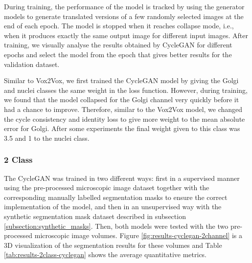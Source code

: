 During training, the performance of the model is tracked by using the generator models to generate translated versions of a few randomly selected images at the end of each epoch. The model is stopped when it reaches collapse mode, i.e., when it produces exactly the same output image for different input images. After training, we visually analyse the results obtained by CycleGAN for different epochs and select the model from the epoch that gives better results for the validation dataset.

Similar to Vox2Vox, we first trained the CycleGAN model by giving the Golgi and nuclei classes the same weight in the loss function. However, during training, we found that the model collapsed for the Golgi channel very quickly before it had a chance to improve. Therefore, similar to the Vox2Vox model, we changed the cycle consistency and identity loss to give more weight to the mean absolute error for Golgi. After some experiments the final weight given to this class was 3.5 and 1 to the nuclei class.


\subsubsection*{2 Class}

The CycleGAN was trained in two different ways: first in a supervised manner using the pre-processed microscopic image dataset together with the corresponding manually labelled segmentation masks to ensure the correct implementation of the model, and then in an unsupervised way with the synthetic segmentation mask dataset described in subsection \ref{subsection:synthetic_masks}. Then, both models were tested with the two pre-processed microscopic image volumes. Figure \ref{fig:results-cyclegan-2channel} is a \ac{3D} visualization of the segmentation results for these volumes and Table \ref{tab:results-2class-cyclegan} shows the average quantitative metrics.

\begin{table}[!htb]
\centering
\caption{Average metric values obtained from training the 2 class CycleGAN model in supervised and unsupervised way and testing these models on two pre-processed microscopic images.}
\label{tab:results-2class-cyclegan}
\end{table}

